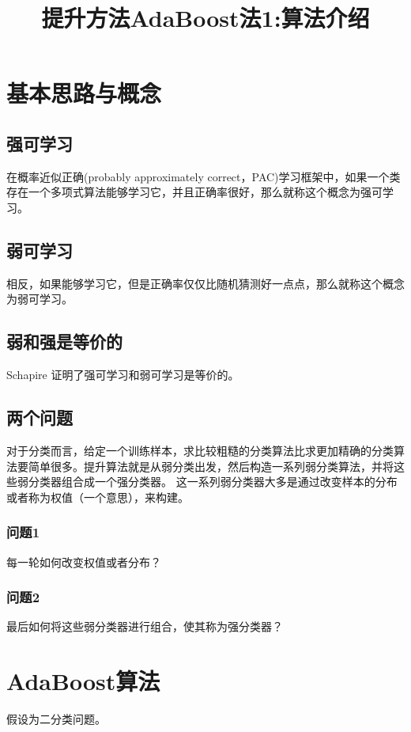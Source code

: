\documentclass[UTF8]{ctexart}
\title{提升方法AdaBoost法1:算法介绍}
\begin{document}
 
\maketitle
 
\section{基本思路与概念}

\subsection{强可学习} 在概率近似正确(probably approximately correct，PAC)学习框架中，如果一个类存在一个多项式算法能够学习它，并且正确率很好，那么就称这个概念为强可学习。
\subsection{弱可学习} 相反，如果能够学习它，但是正确率仅仅比随机猜测好一点点，那么就称这个概念为弱可学习。
\subsection{弱和强是等价的} Schapire 证明了强可学习和弱可学习是等价的。



\subsection{两个问题}
对于分类而言，给定一个训练样本，求比较粗糙的分类算法比求更加精确的分类算法要简单很多。提升算法就是从弱分类出发，然后构造一系列弱分类算法，并将这些弱分类器组合成一个强分类器。
这一系列弱分类器大多是通过改变样本的分布或者称为权值（一个意思），来构建。

\subsubsection{问题1}
每一轮如何改变权值或者分布？
\subsubsection{问题2}
最后如何将这些弱分类器进行组合，使其称为强分类器？


\section{AdaBoost算法}
假设为二分类问题。
\end{document}
